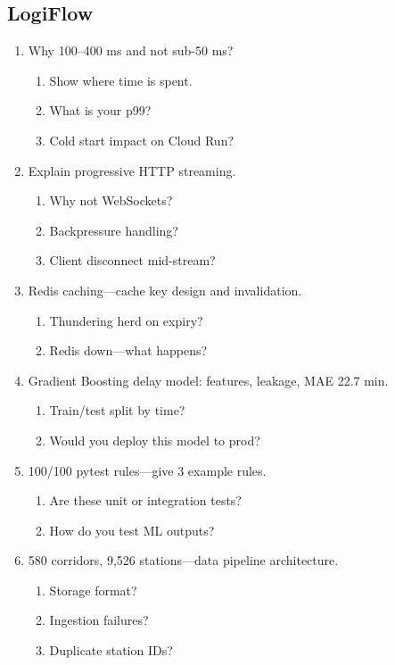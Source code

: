\documentclass[9pt,a4paper]{article}
\begin{document}
\subsection{LogiFlow}
\begin{enumerate}[label=\textbf{Q\arabic*:}, leftmargin=*]
  \item Why 100--400 ms and not sub-50 ms?
  \begin{enumerate}[label=\textit{FU\arabic*:}, leftmargin=2em]
    \item Show where time is spent.
    \item What is your p99?
    \item Cold start impact on Cloud Run?
  \end{enumerate}
  \item Explain progressive HTTP streaming.
  \begin{enumerate}[label=\textit{FU\arabic*:}, leftmargin=2em]
    \item Why not WebSockets?
    \item Backpressure handling?
    \item Client disconnect mid-stream?
  \end{enumerate}
  \item Redis caching---cache key design and invalidation.
  \begin{enumerate}[label=\textit{FU\arabic*:}, leftmargin=2em]
    \item Thundering herd on expiry?
    \item Redis down---what happens?
  \end{enumerate}
  \item Gradient Boosting delay model: features, leakage, MAE 22.7 min.
  \begin{enumerate}[label=\textit{FU\arabic*:}, leftmargin=2em]
    \item Train/test split by time?
    \item Would you deploy this model to prod?
  \end{enumerate}
  \item 100/100 pytest rules---give 3 example rules.
  \begin{enumerate}[label=\textit{FU\arabic*:}, leftmargin=2em]
    \item Are these unit or integration tests?
    \item How do you test ML outputs?
  \end{enumerate}
  \item 580 corridors, 9,526 stations---data pipeline architecture.
  \begin{enumerate}[label=\textit{FU\arabic*:}, leftmargin=2em]
    \item Storage format?
    \item Ingestion failures?
    \item Duplicate station IDs?
  \end{enumerate}
\end{enumerate}
\end{document}

